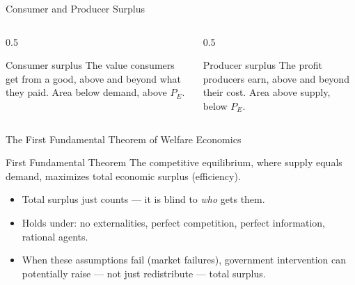\documentclass[11pt,aspectratio=169]{beamer}
\begin{document}
\begin{frame}{Consumer and Producer Surplus}
  \begin{columns}[T]
    \begin{column}{0.5\textwidth}
      \begin{block}{Consumer surplus}
        The value consumers get from a good, above and beyond what they paid. Area below demand, above $P_E$.
      \end{block}
    \end{column}
    \begin{column}{0.5\textwidth}
      \begin{block}{Producer surplus}
        The profit producers earn, above and beyond their cost. Area above supply, below $P_E$.
      \end{block}
    \end{column}
  \end{columns}
  \begin{center}
  \end{center}
\end{frame}

\begin{frame}{The First Fundamental Theorem of Welfare Economics}
  \begin{alertblock}{First Fundamental Theorem}
    The competitive equilibrium, where supply equals demand, maximizes total economic surplus (efficiency).
  \end{alertblock}
  \begin{itemize}
    \item Total surplus just counts \texteuro{} --- it is blind to \emph{who} gets them.
    \item Holds under: no externalities, perfect competition, perfect information, rational agents.
    \item When these assumptions fail (market failures), government intervention can potentially raise --- not just redistribute --- total surplus.
  \end{itemize}
\end{frame}
\end{document}
